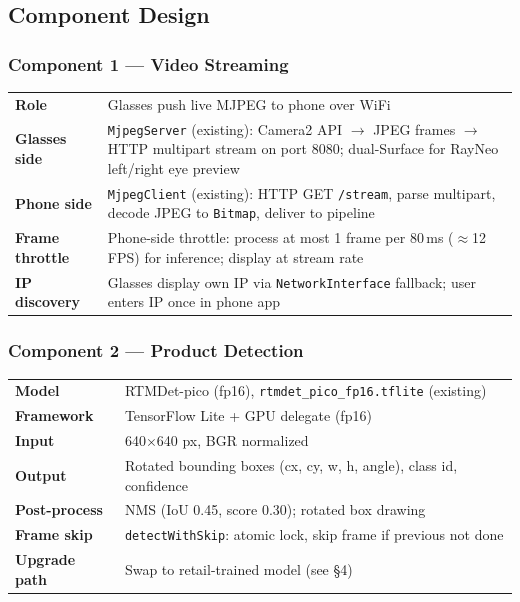 \documentclass[11pt,a4paper]{article}
\begin{document}
\subsection{Component Design}

\subsubsection{Component 1 — Video Streaming}

\begin{table}[h!]
\renewcommand{\arraystretch}{1.3}
\begin{tabularx}{\textwidth}{L{3cm} X}
\toprule
\textbf{Role} & Glasses push live MJPEG to phone over WiFi \\
\textbf{Glasses side} & \texttt{MjpegServer} (existing): Camera2 API $\rightarrow$ JPEG frames $\rightarrow$ HTTP multipart stream on port 8080; dual-Surface for RayNeo left/right eye preview \\
\textbf{Phone side} & \texttt{MjpegClient} (existing): HTTP GET \texttt{/stream}, parse multipart, decode JPEG to \texttt{Bitmap}, deliver to pipeline \\
\textbf{Frame throttle} & Phone-side throttle: process at most 1 frame per 80\,ms ($\approx$12\,FPS) for inference; display at stream rate \\
\textbf{IP discovery} & Glasses display own IP via \texttt{NetworkInterface} fallback; user enters IP once in phone app \\
\bottomrule
\end{tabularx}
\end{table}

\subsubsection{Component 2 — Product Detection}

\begin{table}[h!]
\renewcommand{\arraystretch}{1.3}
\begin{tabularx}{\textwidth}{L{3cm} X}
\toprule
\textbf{Model} & RTMDet-pico (fp16), \texttt{rtmdet\_pico\_fp16.tflite} (existing) \\
\textbf{Framework} & TensorFlow Lite + GPU delegate (fp16) \\
\textbf{Input} & 640×640 px, BGR normalized \\
\textbf{Output} & Rotated bounding boxes (cx, cy, w, h, angle), class id, confidence \\
\textbf{Post-process} & NMS (IoU 0.45, score 0.30); rotated box drawing \\
\textbf{Frame skip} & \texttt{detectWithSkip}: atomic lock, skip frame if previous not done \\
\textbf{Upgrade path} & Swap to retail-trained model (see §4) \\
\bottomrule
\end{tabularx}
\end{table}
\end{document}
